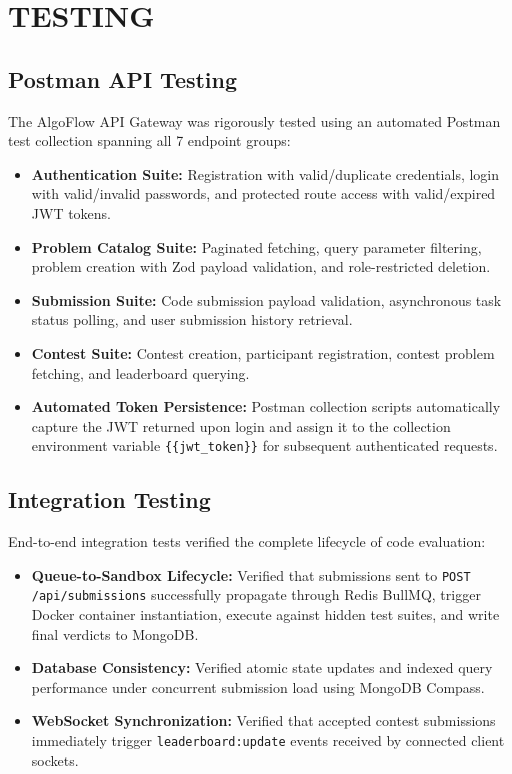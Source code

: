 \documentclass[12pt,a4paper]{report}
\begin{document}
\clearpage

\chapter{TESTING}

\section{Postman API Testing}
The AlgoFlow API Gateway was rigorously tested using an automated Postman test collection spanning all 7 endpoint groups:
\begin{itemize}[leftmargin=*]
  \item \textbf{Authentication Suite:} Registration with valid/duplicate credentials, login with valid/invalid passwords, and protected route access with valid/expired JWT tokens.
  \item \textbf{Problem Catalog Suite:} Paginated fetching, query parameter filtering, problem creation with Zod payload validation, and role-restricted deletion.
  \item \textbf{Submission Suite:} Code submission payload validation, asynchronous task status polling, and user submission history retrieval.
  \item \textbf{Contest Suite:} Contest creation, participant registration, contest problem fetching, and leaderboard querying.
  \item \textbf{Automated Token Persistence:} Postman collection scripts automatically capture the JWT returned upon login and assign it to the collection environment variable \texttt{\{\{jwt\_token\}\}} for subsequent authenticated requests.
\end{itemize}

\section{Integration Testing}
End-to-end integration tests verified the complete lifecycle of code evaluation:
\begin{itemize}[leftmargin=*]
  \item \textbf{Queue-to-Sandbox Lifecycle:} Verified that submissions sent to \texttt{POST /api/submissions} successfully propagate through Redis BullMQ, trigger Docker container instantiation, execute against hidden test suites, and write final verdicts to MongoDB.
  \item \textbf{Database Consistency:} Verified atomic state updates and indexed query performance under concurrent submission load using MongoDB Compass.
  \item \textbf{WebSocket Synchronization:} Verified that accepted contest submissions immediately trigger \texttt{leaderboard:update} events received by connected client sockets.
\end{itemize}
\end{document}
